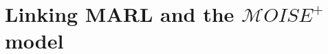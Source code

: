 \documentclass[runningheads]{llncs}
\theoremstyle{freethm}
\theoremstyle{proofoutline}
\begin{document}





\section{Linking MARL and the $\mathcal{M}OISE^+$ model}
\label{sec:marl_moise_linking}
\end{document}
